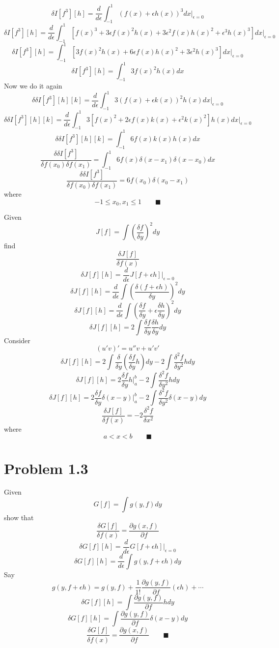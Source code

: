 \documentclass{amsart}
\begin{document}
\[\delta I[f^3][h]=\frac{d}{d\epsilon}\int_{-1}^{1} (f(x)+\epsilon h(x))^3 dx\Big\vert_{\epsilon=0}\]
\[\delta I[f^3][h]=\frac{d}{d\epsilon}\int_{-1}^{1} [f(x)^3+3\epsilon f(x)^2 h(x)+3\epsilon^2 f(x)h(x)^2+\epsilon^3 h(x)^3] dx\Big\vert_{\epsilon=0}\]
\[\delta I[f^3][h]=\int_{-1}^{1} [3f(x)^2 h(x)+6\epsilon f(x)h(x)^2+3\epsilon^2 h(x)^3] dx\Big\vert_{\epsilon=0}\]
\[\delta I[f^3][h]=\int_{-1}^{1} 3f(x)^2 h(x) dx\]
Now we do it again
\[\delta \delta I[f^3][h][k]=\frac{d}{d\epsilon}\int_{-1}^{1} 3(f(x)+\epsilon k(x))^2 h(x) dx\Big\vert_{\epsilon=0}\]
\[\delta \delta I[f^3][h][k]=\frac{d}{d\epsilon}\int_{-1}^{1} 3[f(x)^2+2\epsilon f(x)k(x)+\epsilon^2 k(x)^2] h(x) dx\Big\vert_{\epsilon=0}\]
\[\delta \delta I[f^3][h][k]=\int_{-1}^{1} 6f(x)k(x)h(x) dx\]
\[\frac{\delta \delta I[f^3]}{\delta f(x_0)\delta f(x_1)}=\int_{-1}^{1} 6f(x)\delta(x-x_1)\delta(x-x_0) dx\]
\[\frac{\delta \delta I[f^3]}{\delta f(x_0)\delta f(x_1)}=6f(x_0)\delta(x_0-x_1)\] where \[-1\leq x_0, x_1\leq 1 \qquad \blacksquare\]



Given
\[J[f]=\int \left(\frac{\delta f}{\delta y}\right)^2 dy\]
find
\[\frac{\delta J[f]}{\delta f(x)}\]
\[\delta J[f][h]=\frac{d}{d\epsilon}J[f+\epsilon h]\Big\vert_{\epsilon=0}\]
\[\delta J[f][h]=\frac{d}{d\epsilon}\int \left(\frac{\delta (f+\epsilon h)}{\delta y}\right)^2 dy\]
\[\delta J[f][h]=\frac{d}{d\epsilon}\int \left(\frac{\delta f}{\delta y}+\epsilon\frac{\delta h}{\delta y} \right)^2 dy\]
\[\delta J[f][h]=2\int \frac{\delta f}{\delta y}\frac{\delta h}{\delta y}  dy\]
Consider
\[(u'v)'=u''v+u'v'\]
\[\delta J[f][h]=2\int\frac{\delta}{\delta y}\left(\frac{\delta f}{\delta y}h\right)dy-2\int\frac{\delta^2 f}{\delta y^2}h dy\]
\[\delta J[f][h]=2\frac{\delta f}{\delta y}h\Big\vert_a^b-2\int\frac{\delta^2 f}{\delta y^2}h dy\]
\[\delta J[f][h]=2\frac{\delta f}{\delta y}\delta(x-y)\Big\vert_a^b-2\int\frac{\delta^2 f}{\delta y^2}\delta(x-y) dy\]
\[\frac{\delta J[f]}{\delta f(x)}=-2\frac{\delta^2 f}{\delta x^2}\] where \[a<x<b \qquad \blacksquare\]

\section*{Problem 1.3}
Given \[G[f]=\int g(y,f)dy\]
show that \[\frac{\delta G[f]}{\delta f(x)}=\frac{\partial g(x,f)}{\partial f} \]
\[\delta G[f][h]=\frac{d}{d\epsilon}G[f+\epsilon h]\Big\vert_{\epsilon=0}\]
\[\delta G[f][h]=\frac{d}{d\epsilon}\int g(y,f+\epsilon h)dy\]
Say \[g(y,f+\epsilon h)=g(y,f)+\frac{1}{1!}\frac{\partial g(y,f)}{\partial f}(\epsilon h) + \cdots \]
\[\delta G[f][h]=\int\frac{\partial g(y,f)}{\partial f}hdy\]
\[\delta G[f][h]=\int\frac{\partial g(y,f)}{\partial f}\delta(x-y)dy\]
\[\frac{\delta G[f]}{\delta f(x)}=\frac{\partial g(x,f)}{\partial f} \qquad \blacksquare\]
\end{document}
